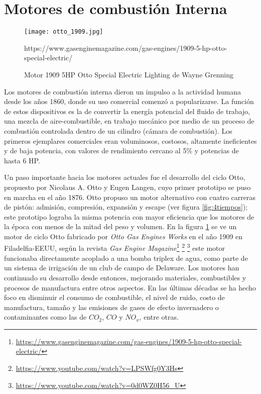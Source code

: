 \section{Motores de combustión Interna}

\begin{figure} \centering \texttt{[image: otto\_1909.jpg]}
    \caption{Motor 1909 5HP Otto Special Electric Lighting de Wayne
Grenning}\label{fig:otto1909} %
https://www.gasenginemagazine.com/gas-engines/1909-5-hp-otto-special-electric/
\end{figure}

Los motores de combustión interna dieron un impulso a la actividad humana desde
los años 1860, donde su uso comercial comenzó a popularizarse.
%
La función de estos dispositivos es la de convertir la energía potencial del
fluido de trabajo, una mezcla de aire-combustible, en trabajo mecánico por medio
de un proceso de combustión controlada dentro de un cilindro (cámara de
combustión).
%
Los primeros ejemplares comerciales eran voluminosos, costosos, altamente
ineficientes y de baja potencia, con valores de rendimiento cercano al 5\% y
potencias de hasta 6 HP.

Un paso importante hacia los motores actuales fue el desarrollo del ciclo Otto,
propuesto por Nicolaus A. Otto y Eugen Langen, cuyo primer prototipo se puso en
marcha en el año 1876.
%
Otto propuso un motor alternativo con cuatro carreras de pistón: admisión,
compresión, expansión y escape (ver figura \ref{fig:4tiempos}); este prototipo
lograba la misma potencia con mayor eficiencia que los motores de la época con
menos de la mitad del peso y volumen.
%
En la figura \ref{fig:otto1909} se ve un motor de ciclo Otto fabricado por
\emph{Otto Gas Engines Works} en el año 1909 en Filadelfia-EEUU, según la
revista \emph{Gas Engine
Magazine}\footnote{\url{https://www.gasenginemagazine.com/gas-engines/1909-5-hp-otto-special-electric/}}
\footnote{ \url{https://www.youtube.com/watch?v=LPSWfg0Y3Hs} } \footnote{
\url{https://www.youtube.com/watch?v=0d0WZ0H56_U} } este motor funcionaba
directamente acoplado a una bomba triplex de agua, como parte de un sistema de
irrigación de un club de campo de Delaware.
%
Los motores han continuado su desarrollo desde entonces, mejorando materiales,
combustibles y procesos de manufactura entre otros aspectos.
%
En las últimas décadas se ha hecho foco en disminuir el consumo de combustible,
el nivel de ruido, costo de manufactura, tamaño y las emisiones de gases de
efecto invernadero o contaminantes como las de $CO_2$, $CO$ y $NO_x$, entre
otras.



